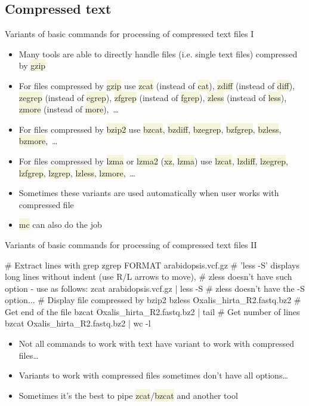 \documentclass[compress, ucs, xelatex, 11pt, xcolor=svgnames, aspectratio=169,
	hyperref={
		bookmarks=true,
		unicode=true,
		colorlinks=true,
		pdftitle={Linux, command line and MetaCentrum},
		plainpages=false,
		pdfauthor={Vojtech Zeisek},
		pdfsubject={Course about use of Linux command line, writing shell scripts and using MetaCentrum of CESNET},
		pdfcreator={XeLaTeX},
		pdfkeywords={Linux, GNU, BASH, shell, command line, MetaCentrum},
		linkcolor=DarkRed, %
		anchorcolor=DarkBlue, %
		citecolor=Indigo, %
		filecolor=NavyBlue, %
		menucolor=DarkMagenta, %
		urlcolor=DarkBlue, %
		pdftex},
	url={hyphens, lowtilde} %
	]{beamer}
\renewcommand{\texttt}[1]{\colorbox{Beige}{{\ttfamily #1}}}
\begin{document}
\subsection{Compressed text}

\begin{frame}{Variants of basic commands for processing of compressed text files I}
	\begin{itemize}
		\item Many tools are able to directly handle files (i.e. single text files) compressed by \texttt{gzip}
		\item For files compressed by \texttt{gzip} use \texttt{zcat} (instead of \texttt{cat}), \texttt{zdiff} (instead of \texttt{diff}), \texttt{zegrep} (instead of \texttt{egrep}), \texttt{zfgrep} (instead of \texttt{fgrep}), \texttt{zless} (instead of \texttt{less}), \texttt{zmore} (instead of \texttt{more}),~\ldots
		\item For files compressed by \texttt{bzip2} use \texttt{bzcat}, \texttt{bzdiff}, \texttt{bzegrep}, \texttt{bzfgrep}, \texttt{bzless}, \texttt{bzmore},~\ldots
		\item For files compressed by \texttt{lzma} or \texttt{lzma2} (\texttt{xz}, \texttt{lzma}) use \texttt{lzcat}, \texttt{lzdiff}, \texttt{lzegrep}, \texttt{lzfgrep}, \texttt{lzgrep}, \texttt{lzless}, \texttt{lzmore},~\ldots
		\item Sometimes these variants are used automatically when user works with compressed file
		\item \texttt{mc} can also do the job
	\end{itemize}
\end{frame}

\begin{frame}[fragile]{Variants of basic commands for processing of compressed text files II}
	\begin{bashcode}
    # Extract lines with grep
    zgrep FORMAT arabidopsis.vcf.gz
    # 'less -S' displays long lines without indent (use R/L arrows to move),
    # zless doesn't have such option - use as follows:
    zcat arabidopsis.vcf.gz | less -S # zless doesn't have the -S option...
    # Display file compressed by bzip2
    bzless Oxalis_hirta_R2.fastq.bz2
    # Get end of the file
    bzcat Oxalis_hirta_R2.fastq.bz2 | tail
    # Get number of lines
    bzcat Oxalis_hirta_R2.fastq.bz2 | wc -l
	\end{bashcode}
	\begin{itemize}
		\item Not all commands to work with text have variant to work with compressed files\ldots
		\item Variants to work with compressed files sometimes don't have all options\ldots
		\item Sometimes it's the best to pipe \texttt{zcat}/\texttt{bzcat} and another tool
	\end{itemize}
\end{frame}
\end{document}

